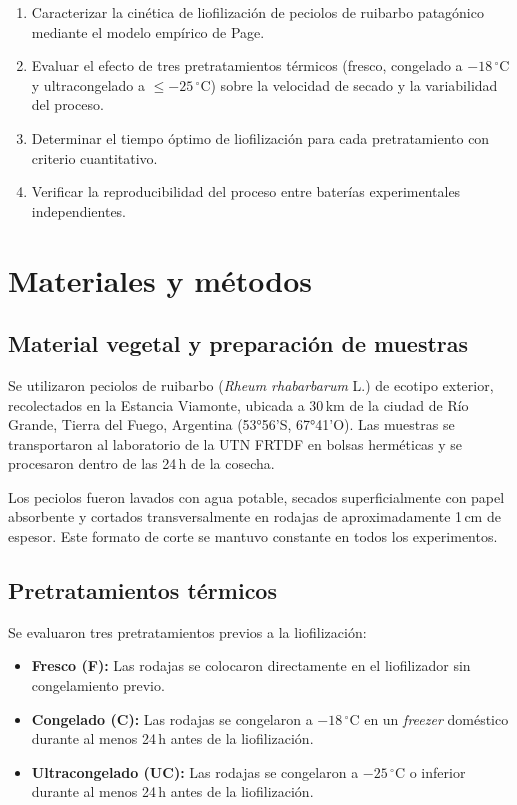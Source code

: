 \documentclass[12pt, a4paper]{article}
\begin{document}
\begin{enumerate}
    \item Caracterizar la cinética de liofilización de peciolos de ruibarbo patagónico mediante el modelo empírico de Page.
    \item Evaluar el efecto de tres pretratamientos térmicos (fresco, congelado a $-18\,^\circ$C y ultracongelado a $\leq -25\,^\circ$C) sobre la velocidad de secado y la variabilidad del proceso.
    \item Determinar el tiempo óptimo de liofilización para cada pretratamiento con criterio cuantitativo.
    \item Verificar la reproducibilidad del proceso entre baterías experimentales independientes.
\end{enumerate}

\section{Materiales y métodos}

\subsection{Material vegetal y preparación de muestras}

Se utilizaron peciolos de ruibarbo (\textit{Rheum rhabarbarum} L.) de ecotipo exterior, recolectados en la Estancia Viamonte, ubicada a 30\,km de la ciudad de Río Grande, Tierra del Fuego, Argentina (53°56'S, 67°41'O). Las muestras se transportaron al laboratorio de la UTN FRTDF en bolsas herméticas y se procesaron dentro de las 24\,h de la cosecha.

Los peciolos fueron lavados con agua potable, secados superficialmente con papel absorbente y cortados transversalmente en rodajas de aproximadamente 1\,cm de espesor. Este formato de corte se mantuvo constante en todos los experimentos.

\subsection{Pretratamientos térmicos}

Se evaluaron tres pretratamientos previos a la liofilización:

\begin{itemize}
    \item \textbf{Fresco (F):} Las rodajas se colocaron directamente en el liofilizador sin congelamiento previo.
    \item \textbf{Congelado (C):} Las rodajas se congelaron a $-18\,^\circ$C en un \textit{freezer} doméstico durante al menos 24\,h antes de la liofilización.
    \item \textbf{Ultracongelado (UC):} Las rodajas se congelaron a $-25\,^\circ$C o inferior durante al menos 24\,h antes de la liofilización.
\end{itemize}
\end{document}
